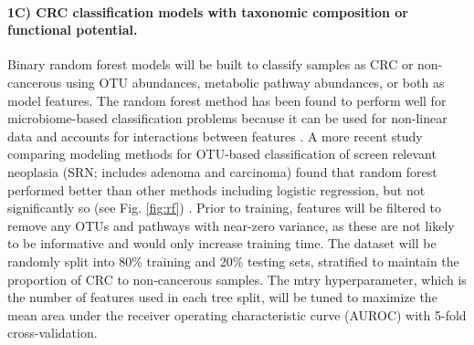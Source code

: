 \documentclass[11pt]{article}
\begin{document}
\paragraph{1C) CRC classification models with taxonomic composition or functional potential.}

\begin{figure}
    \vspace{-8pt}
\end{figure}
Binary random forest models will be built to classify samples as CRC or non-cancerous using OTU abundances, metabolic pathway abundances, or both as model features.
The random forest method has been found to perform well for microbiome-based classification problems because it can be used for non-linear data and accounts for interactions between features \cite{baxter_microbiota-based_2016}.
A more recent study comparing modeling methods for OTU-based classification of screen relevant neoplasia (SRN; includes adenoma and carcinoma) found that random forest performed better than other methods including logistic regression, but not significantly so (see Fig. \ref{fig:rf}) \cite{topcuoglu_framework_2020}.
Prior to training, features will be filtered to remove any OTUs and pathways with near-zero variance, as these are not likely to be informative and would only increase training time.
The dataset will be randomly split into 80\% training and 20\% testing sets, stratified to maintain the proportion of CRC to non-cancerous samples.
The mtry hyperparameter, which is the number of features used in each tree split, will be tuned to maximize the mean area under the receiver operating characteristic curve (AUROC) with 5-fold cross-validation.
\end{document}
